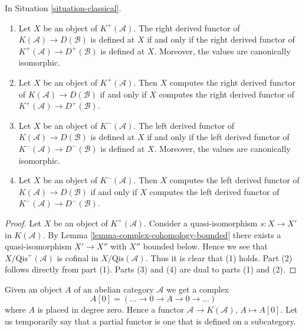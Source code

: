 \begin{lemma}
\label{lemma-irrelevant}
In
Situation \ref{situation-classical}.
\begin{enumerate}
\item Let $X$ be an object of $K^{+}(\mathcal{A})$.
The right derived functor of $K(\mathcal{A}) \to D(\mathcal{B})$
is defined at $X$ if and only if the right derived functor of
$K^{+}(\mathcal{A}) \to D^{+}(\mathcal{B})$ is defined at $X$.
Moreover, the values are canonically isomorphic.
\item Let $X$ be an object of $K^{+}(\mathcal{A})$.
Then $X$ computes the right derived functor of
$K(\mathcal{A}) \to D(\mathcal{B})$
if and only if $X$ computes the right derived functor of
$K^{+}(\mathcal{A}) \to D^{+}(\mathcal{B})$.
\item Let $X$ be an object of $K^{-}(\mathcal{A})$.
The left derived functor of $K(\mathcal{A}) \to D(\mathcal{B})$
is defined at $X$ if and only if the left derived functor of
$K^{-}(\mathcal{A}) \to D^{-}(\mathcal{B})$ is defined at $X$.
Moreover, the values are canonically isomorphic.
\item Let $X$ be an object of $K^{-}(\mathcal{A})$.
Then $X$ computes the left derived functor of
$K(\mathcal{A}) \to D(\mathcal{B})$ if and only if $X$ computes
the left derived functor of $K^{-}(\mathcal{A}) \to D^{-}(\mathcal{B})$.
\end{enumerate}
\end{lemma}

\begin{proof}
Let $X$ be an object of $K^{+}(\mathcal{A})$.
Consider a quasi-isomorphism $s : X \to X'$ in $K(\mathcal{A})$.
By
Lemma \ref{lemma-complex-cohomology-bounded}
there exists a quasi-isomorphism $X' \to X''$ with $X''$ bounded below.
Hence we see that $X/\text{Qis}^+(\mathcal{A})$ is cofinal
in $X/\text{Qis}(\mathcal{A})$. Thus it is clear that (1) holds.
Part (2) follows directly from part (1).
Parts (3) and (4) are dual to parts (1) and (2).
\end{proof}

\noindent
Given an object $A$ of an abelian category $\mathcal{A}$ we get a complex
$$
A[0] = ( \ldots \to 0 \to A \to 0 \to \ldots )
$$
where $A$ is placed in degree zero. Hence a functor
$\mathcal{A} \to K(\mathcal{A})$, $A \mapsto A[0]$.
Let us temporarily say that a partial functor is one that is
defined on a subcategory.

